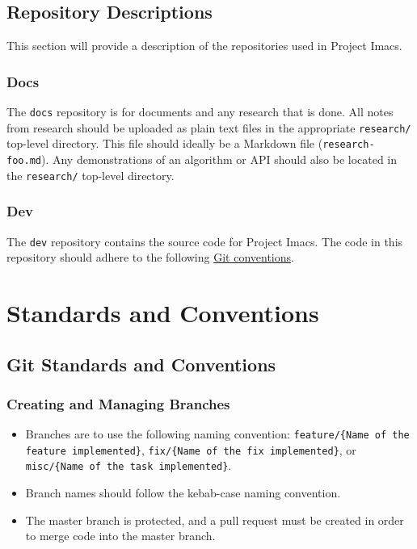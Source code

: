 \documentclass{article}
\begin{document}
\subsection{Repository Descriptions}
This section will provide a description of the repositories used in Project Imacs.

\subsubsection{Docs}
The \texttt{docs} repository is for documents and any research that is done. All notes from research should be uploaded as plain text files in the appropriate \texttt{research/} top-level directory. This file should ideally be a Markdown file (\texttt{research-foo.md}). Any demonstrations of an algorithm or API should also be located in the \texttt{research/} top-level directory.

\subsubsection{Dev}
The \texttt{dev} repository contains the source code for Project Imacs. The code in this repository should adhere to the following \hyperref[sec:git-conventions]{Git conventions}.

\section{Standards and Conventions}
\subsection{Git Standards and Conventions}
\label{sec:git-conventions}
\subsubsection{Creating and Managing Branches}
\begin{itemize}
\item Branches are to use the following naming convention: \texttt{feature/\{Name of the feature implemented\}}, \texttt{fix/\{Name of the fix implemented\}}, or \texttt{misc/\{Name of the task implemented\}}.
\item Branch names should follow the kebab-case naming convention.
\item The master branch is protected, and a pull request must be created in order to merge code into the master branch.
\end{itemize}
\end{document}
